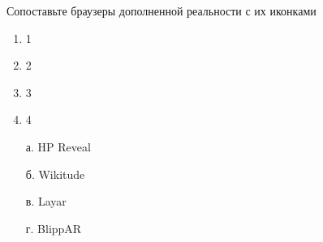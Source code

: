 
Сопоставьте браузеры дополненной реальности с их иконками


\begin{multicols}{2}
    {
        \begin{enumerate}
            \item 1
            \item 2
            \item 3
            \item 4
        \end{enumerate}
    }    
    {
        \begin{enumerate}
            \item[а.] HP Reveal
            \item[б.] Wikitude
            \item[в.] Layar
            \item[г.] BlippAR 
        \end{enumerate}
    }
\end{multicols}

